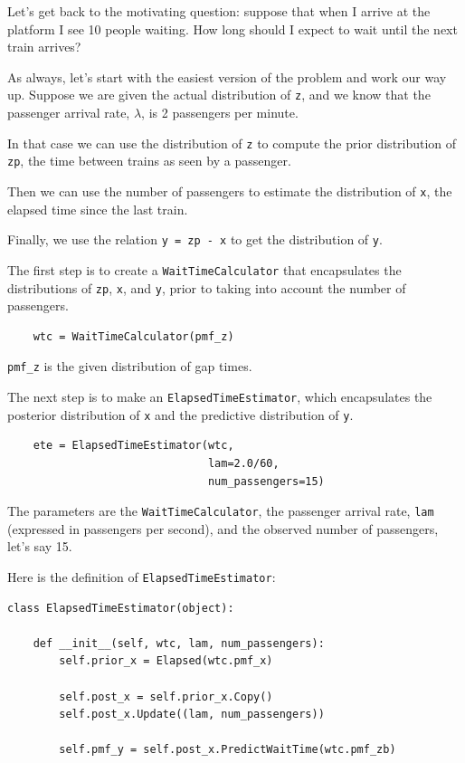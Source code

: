 \documentclass[12pt]{book}
\begin{document}
Let's get back to the motivating question: suppose that when
I arrive at the platform I see 10 people waiting.
How long should I expect to wait until the next train arrives?

As always, let's start with the easiest version of the problem
and work our way up.  Suppose we are given the actual distribution of
{\tt z}, and we know that the passenger arrival rate,
$\lambda$, is 2 passengers per minute.

In that case we can use the distribution of {\tt z} to compute
the prior distribution of {\tt zp}, the time between trains
as seen by a passenger.

Then we can use the number of passengers to estimate the distribution
of {\tt x}, the elapsed time since the last train.

Finally, we use the relation {\tt y = zp - x} to get the
distribution of {\tt y}.

The first step is to create a {\tt WaitTimeCalculator} that
encapsulates the distributions of {\tt zp}, {\tt x},
and {\tt y}, prior to taking into account the number of
passengers.

\begin{verbatim}
    wtc = WaitTimeCalculator(pmf_z)
\end{verbatim}

\verb"pmf_z" is the given distribution of gap times.

The next
step is to make an {\tt ElapsedTimeEstimator}, which encapsulates
the posterior distribution of {\tt x} and
the predictive distribution of {\tt y}.

\begin{verbatim}
    ete = ElapsedTimeEstimator(wtc,
                               lam=2.0/60,
                               num_passengers=15)
\end{verbatim}

The parameters are the {\tt WaitTimeCalculator}, the passenger
arrival rate, {\tt lam} (expressed in passengers per second),
and the observed number of passengers, let's say 15.

Here is the definition of {\tt ElapsedTimeEstimator}:

\begin{verbatim}
class ElapsedTimeEstimator(object):

    def __init__(self, wtc, lam, num_passengers):
        self.prior_x = Elapsed(wtc.pmf_x)

        self.post_x = self.prior_x.Copy()
        self.post_x.Update((lam, num_passengers))

        self.pmf_y = self.post_x.PredictWaitTime(wtc.pmf_zb)
\end{verbatim}
\end{document}
